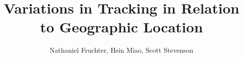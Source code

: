 \documentclass[journal]{IEEEtran}
\begin{document}
%
\title{Variations in Tracking in Relation to Geographic Location}
%
%
%

\author{ Nathaniel Fruchter,
        Hsin Miao,
        Scott Stevenson
        }%
% 
%



% 




\end{document}

